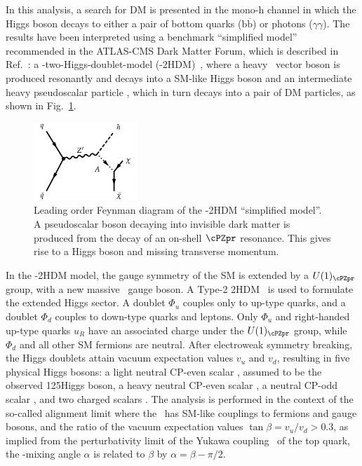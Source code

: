 In this analysis, a search for DM is presented in the mono-h channel
in which the Higgs boson decays to either a pair of bottom quarks 
($\mathrm{b \overline{b}}$) or photons ($\gamma\gamma$). 
The results have been interpreted using a benchmark ``simplified model'' 
recommended in the ATLAS-CMS Dark Matter Forum, which is described in 
Ref.~\cite{Abercrombie:2015wmb}: a \cPZpr-two-Higgs-doublet-model 
(\cPZpr-2HDM)~\cite{2HDM}, where a heavy \cPZpr\ vector boson 
is produced resonantly and decays into a SM-like Higgs boson \Ph and an 
intermediate heavy pseudoscalar particle \Az, which in turn decays into 
a pair of DM particles, as shown in Fig.~\ref{fig:feynman}. 
\begin{figure}[htbp]
\centering
\includegraphics[width=0.35\textwidth]{Figure_001.pdf}
\caption{Leading order Feynman diagram of the \cPZpr-2HDM ``simplified model''. A pseudoscalar boson \Az decaying into invisible dark matter is produced from 
the decay of an on-shell $\cPZpr$ resonance. This gives rise to a Higgs boson 
and missing transverse momentum.}
\label{fig:feynman}
\end{figure}

In the \cPZpr-2HDM model, the gauge symmetry of the SM is extended by a
$U(1)_{\cPZpr}$ group, with a new massive \cPZpr\ gauge boson.
A Type-2 2HDM~\cite{Lee:1973iz,Branco:2011iw} is used to formulate 
the extended Higgs sector.
A doublet $\Phi_u$ couples only to up-type quarks, and 
a doublet $\Phi_d$ couples to down-type
quarks and leptons. 
Only $\Phi_u$ and right-handed up-type quarks $u_R$ have an associated charge 
under the $U(1)_{\cPZpr}$ group, while $\Phi_d$ and all other SM
fermions are neutral. 
After electroweak symmetry breaking, the Higgs doublets attain vacuum 
expectation values $v_u$ and $v_d$, 
resulting in five physical Higgs bosons: 
a light neutral CP-even scalar \Ph, assumed to be the 
observed 125\GeV Higgs boson, a heavy neutral CP-even scalar \PH,
a neutral CP-odd scalar \Az, and two charged scalars \Hpm.  
The analysis is performed in the context of the so-called 
alignment limit where the \Ph\ has SM-like couplings to fermions and gauge
bosons, and the ratio of the vacuum expectation values $\tan \beta = v_u/v_d > 0.3$, as implied from the perturbativity limit of the Yukawa 
coupling~\cite{2HDM,Craig:2013hca} of the top quark, the \Ph-\PH mixing angle $\alpha$ is 
related to $\beta$ by $\alpha = \beta - \pi/2$. 

